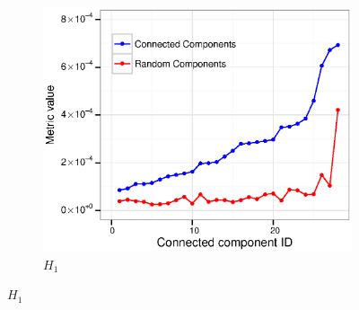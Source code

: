 \documentclass[10pt,letterpaper]{article}
\begin{document}
\begin{figure}
\begin{subfigure}[b]{0.3\textwidth}
    \includegraphics[width=\textwidth]{figures_SI/Plots_from_data/cc_validation/H1.eps}
    \caption{$H_1$} \label{fig:H1}
  \end{subfigure}


\end{figure}
\end{document}
